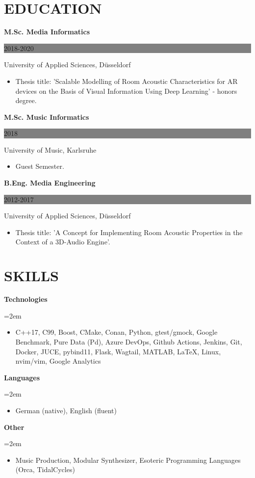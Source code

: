 \documentclass[paper=a4,fontsize=9pt]{scrartcl}
\newcommand{\sepspace}{\vspace*{1em}}
\newcommand{\NewPart}[1]{\section*{\uppercase{#1}}}
\newcommand{\SkillsEntry}[4]{
		\noindent \textbf{#1} \hfill
		\colorbox{White}{\color{White}#2} \par
		\noindent #3 \par
		\noindent\hangindent=2em\hangafter=0 \small
        \begin{itemize}[itemsep=0pt, topsep=0pt, leftmargin=1.2em, label={}]
            \item #4
        \end{itemize}
		\normalsize \par}
\newcommand{\ExperienceEntry}[4]{
	\noindent \textbf{#1} \hfill
	\colorbox{Grey}{
		\parbox{6em}{
		\hfill\color{White}#2}} \par
	\noindent #3 \par
    \noindent \small #4
	\normalsize \par
}
\begin{document}
\NewPart{Education}{}
\ExperienceEntry{M.Sc. Media Informatics}{2018-2020}{University of Applied Sciences, Düsseldorf}{
    \begin{itemize}[leftmargin=1.2em, label={}]
        \item Thesis title: 'Scalable Modelling of Room Acoustic Characteristics for AR devices on the Basis of Visual Information Using Deep Learning' - honors degree.
    \end{itemize}
}
\sepspace
\ExperienceEntry{M.Sc. Music Informatics}{2018}{University of Music, Karlsruhe}{
    \begin{itemize}[leftmargin=1.2em, label={}]
        \item Guest Semester.
    \end{itemize}
}
\sepspace
\ExperienceEntry{B.Eng. Media Engineering}{2012-2017}{University of Applied Sciences, Düsseldorf}{
    \begin{itemize}[leftmargin=1.2em, label={}]
        \item Thesis title: 'A Concept for Implementing Room Acoustic Properties in the Context of a 3D-Audio Engine'.
    \end{itemize}
}

\NewPart{Skills}{}
\SkillsEntry{Technologies}{}{}{\textsc{C++17}, C99, Boost, CMake, Conan, Python, gtest/gmock, Google Benchmark, Pure Data (Pd), Azure DevOps, Github Actions, Jenkins, Git, Docker, JUCE, pybind11, Flask, Wagtail, MATLAB, \LaTeX, Linux, nvim/vim, Google Analytics}
\sepspace
\SkillsEntry{Languages}{}{}{German (native), English (fluent)}
\sepspace
\SkillsEntry{Other}{}{}{Music Production, Modular Synthesizer, Esoteric Programming Languages (Orca, TidalCycles)}
\end{document}
